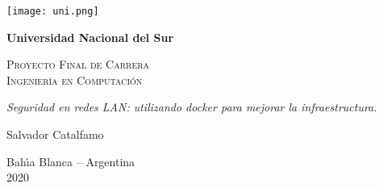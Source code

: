\begin{titlepage}

\begin{center}
\texttt{[image: uni.png]}
\end{center}

\begin{center}

\textbf{\LARGE Universidad Nacional del Sur}\\

\vspace{2cm}

\textsc{\LARGE Proyecto Final de Carrera}\\ \vspace{.1cm}
\textsc{\LARGE Ingenier\'ia en Computaci\'on}\\


\vspace{4cm}

\emph{\LARGE Seguridad en redes LAN: utilizando docker para mejorar la infraestructura.}\\

\vspace{2.5cm}

{\Large Salvador Catalfamo}\\

\vspace{2.5cm}

{\sc\Large Bah\'{\i}a Blanca -- Argentina}\\
\vspace*{.1cm} {\Large 2020}

\end{center}
\end{titlepage}
